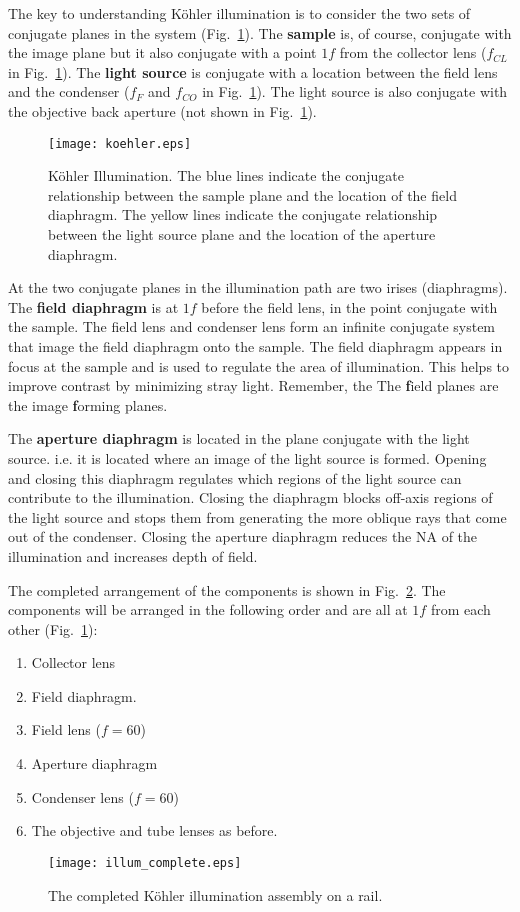 \documentclass[a4paper]{report}
\begin{document}
The key to understanding K\"{o}hler illumination is to consider the two sets of conjugate planes in the system (Fig.~\ref{fig:koehler}). 
The \textbf{sample} is, of course, conjugate with the image plane but it also conjugate with a point $1f$ from the collector lens ($f_{CL}$ in Fig.~\ref{fig:koehler}). 
The \textbf{light source} is conjugate with a location between the field lens and the condenser ($f_F$ and $f_{CO}$ in Fig.~\ref{fig:koehler}). 
The light source is also conjugate with the objective back aperture (not shown in Fig.~\ref{fig:koehler}). 

\begin{figure}[ht]
\center
\texttt{[image: koehler.eps]}
\caption{K\"{o}hler Illumination. 
The blue lines indicate the conjugate relationship between the sample plane and the location of the field diaphragm.
The yellow lines indicate the conjugate relationship between the light source plane and the location of the aperture diaphragm.
}
\label{fig:koehler}
\end{figure}

At the two conjugate planes in the illumination path are two irises (diaphragms). 
The \textbf{field diaphragm} is at $1f$ before the field lens, in the point conjugate with the sample. 
The field lens and condenser lens form an infinite conjugate system that image the field diaphragm onto the sample. 
The field diaphragm appears in focus at the sample and is used to regulate the area of illumination. 
This helps to improve contrast by minimizing stray light. 
Remember, the The \textbf{f}ield planes are the image \textbf{f}orming planes. 

The \textbf{aperture diaphragm} is located in the plane conjugate with the light source. 
i.e. it is located where an image of the light source is formed. 
Opening and closing this diaphragm regulates which regions of the light source can contribute to the illumination. 
Closing the diaphragm blocks off-axis regions of the light source and stops them from generating the more oblique rays that come out of the condenser. 
Closing the aperture diaphragm reduces the NA of the illumination and increases depth of field. 

\clearpage

The completed arrangement of the components is shown in Fig.~\ref{fig:koehler_completed}. 
The components will be arranged in the following order and are all at $1f$ from each other (Fig.~\ref{fig:koehler}):
\begin{enumerate}
\setlength\itemsep{0.1em}
\item Collector lens
\item Field diaphragm.
\item Field lens ($f=60$)
\item Aperture diaphragm
\item Condenser lens ($f=60$)
\item The objective and tube lenses as before.
\end{enumerate}




\begin{figure}[h]
\center
\texttt{[image: illum\_complete.eps]}
\caption{The completed K\"{o}hler illumination assembly on a rail.}
\label{fig:koehler_completed}
\end{figure}
\end{document}

